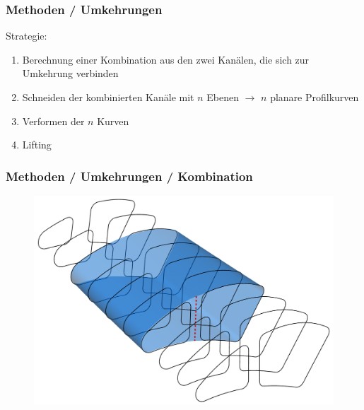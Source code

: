 \documentclass[8pt, aspectratio=169]{beamer}
\begin{document}
\begin{frame}
	\frametitle{Methoden / Umkehrungen}
	\vspace{-1cm}\hspace{-0.5cm}
	\begin{minipage}[t]{\textwidth}
		Strategie:
		\begin{enumerate}
			\item Berechnung einer Kombination aus den zwei Kanälen, die sich zur Umkehrung verbinden
			\item Schneiden der kombinierten Kanäle mit $n$ Ebenen $\rightarrow$ $n$ planare Profilkurven
			\item Verformen der $n$ Kurven
			\item Lifting
		\end{enumerate}
	\end{minipage}
\end{frame}

\begin{frame}
	\frametitle{Methoden / Umkehrungen / Kombination}
	\vspace{-1cm}\hspace{-0.5cm}
	\begin{figure}
		\centering
		\includegraphics[height=.8\textheight]{../tec/turn/12.png}
	\end{figure}
\end{frame}
\end{document}
